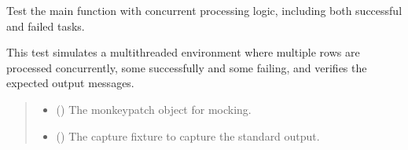\documentclass[letterpaper,10pt,english]{sphinxmanual}
\begin{document}
\begin{fulllineitems}
\label{\detokenize{test.data_storage:test.data_storage.test_llm_analyse.test_main_concurrent_processing}}
\pysigstartsignatures
\pysiglinewithargsret
{}
{\sphinxparamcomma {}}
{}
\pysigstopsignatures
\sphinxAtStartPar
Test the main function with concurrent processing logic, including both successful
and failed tasks.

\sphinxAtStartPar
This test simulates a multi\sphinxhyphen{}threaded environment where multiple rows are processed concurrently,
some successfully and some failing, and verifies the expected output messages.
\begin{quote}\begin{description}
\begin{itemize}
\item {} 
\sphinxAtStartPar
{} () \textendash{} The monkeypatch object for mocking.

\item {} 
\sphinxAtStartPar
{} () \textendash{} The capture fixture to capture the standard output.

\end{itemize}

\end{description}\end{quote}

\end{fulllineitems}

\end{document}
